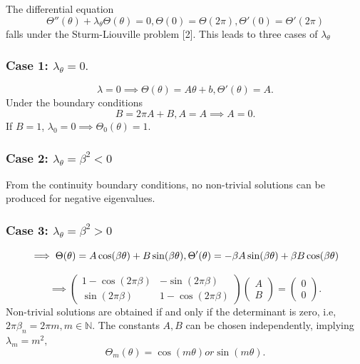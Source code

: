 \documentclass{article}
\begin{document}
The differential equation
\begin{equation*}
	\Theta''(\theta)+\lambda_{\theta}\Theta(\theta)=0, \Theta(0)=\Theta(2 \pi), \Theta'(0)=\Theta'(2 \pi)
\end{equation*}falls under the Sturm-Liouville problem [2]. This leads to three cases of $\lambda_{\theta}$

\subsubsection{Case 1: $\lambda_{\theta}=0.$ }

\begin{equation*}
	\lambda=0 \implies \Theta(\theta)=A\theta+b, \Theta'(\theta)=A.
\end{equation*}
Under the boundary conditions
\begin{equation*}
	B=2\pi A + B, A=A \implies A=0.
\end{equation*}
If $B=1$, $\lambda_0=0 \implies \Theta_0(\theta)=1.$

\subsubsection{Case 2: $\lambda_{\theta}=\beta^2 < 0$}

From the continuity boundary conditions, no non-trivial solutions can be produced for negative eigenvalues. 

\subsubsection{Case 3: $\lambda_{\theta} = \beta^2 > 0$}
\begin{equation*}
	\implies \Theta(\theta)=A\cos(\beta \theta) + B\sin(\beta \theta), \Theta'(\theta)=-\beta A\sin(\beta \theta)+\beta B \cos(\beta \theta) \newline
\end{equation*}

\begin{equation*}
 \implies 
\begin{pmatrix}
 1-\cos(2\pi \beta) & -\sin(2\pi \beta) \\
 \sin(2\pi \beta) & 1-\cos(2\pi \beta)
\end{pmatrix} 
\begin{pmatrix}
A \\ B
\end{pmatrix} = \begin{pmatrix}
0 \\ 0
\end{pmatrix}.
\end{equation*}
Non-trivial solutions are obtained if and only if the determinant is zero, i.e, $2\pi \beta_n=2\pi m, m \in \mathbb{N}$. The constants $A,B$ can be chosen independently, implying $\lambda_m = m^2,$
\begin{equation*}
\Theta_m(\theta)=\cos(m\theta) or \sin(m\theta).
\end{equation*}
\end{document}
